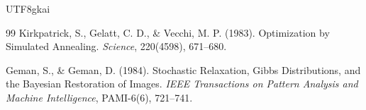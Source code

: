 \documentclass[12pt]{article}
\begin{document}
\begin{CJK*}{UTF8}{gkai}
\begin{thebibliography}{99}
Kirkpatrick, S., Gelatt, C. D., \& Vecchi, M. P. (1983).
\newblock Optimization by Simulated Annealing.
\newblock \emph{Science}, 220(4598), 671--680.

Geman, S., \& Geman, D. (1984).
\newblock Stochastic Relaxation, Gibbs Distributions, and the Bayesian Restoration of Images.
\newblock \emph{IEEE Transactions on Pattern Analysis and Machine Intelligence}, PAMI-6(6), 721--741.

\end{thebibliography}

\end{CJK*}
\end{document}
